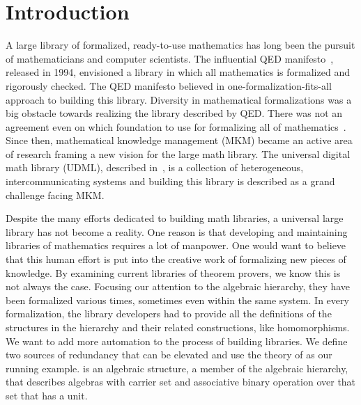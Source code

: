 \chapter{Introduction}
\label{ch:intro}

A large library of formalized, ready-to-use mathematics has long been the pursuit of mathematicians and computer scientists.  
The influential QED manifesto~\citep{boyer1994qed}, released in 1994, envisioned a library in which all mathematics is formalized and rigorously checked. The QED manifesto believed in one-formalization-fits-all approach to building this library.
Diversity in mathematical formalizations was a big obstacle towards realizing the library described by QED. There was not an agreement even on which foundation to use for formalizing all of mathematics~\cite{qedrealoaded2016}.  Since then, mathematical knowledge management (MKM) became an active area of research framing a new vision for the large math library. The universal digital math library (UDML), described in~\cite{farmer2004mkm}, is a collection of heterogeneous, intercommunicating systems and building this library is described as a grand challenge facing MKM. 

Despite the many efforts dedicated to building math libraries, a universal large library has not become a reality. One reason is that developing and maintaining libraries of mathematics requires a lot of manpower. One would want to believe that this human effort is put into the creative work of formalizing new pieces of knowledge. By examining current libraries of theorem provers, we know this is not always the case. Focusing our attention to the algebraic hierarchy, they have been formalized various times, sometimes even within the same system. In every formalization, the library developers had to provide all the definitions of the structures in the hierarchy and their related constructions, like homomorphisms. We want to add more automation to the process of building libraries. We define two sources of redundancy that can be elevated and use the theory of  as our running example.  is an algebraic structure, a member of the algebraic hierarchy, that describes algebras with carrier set and associative binary operation over that set that has a unit.

